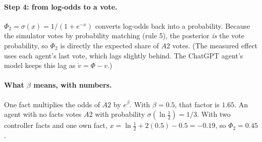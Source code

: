 \documentclass[10pt,a4paper]{article}
\begin{document}
\paragraph{Step 4: from log-odds to a vote.} $\Phi_2=\sigma(x)=1/(1+e^{-x})$ converts log-odds back into a probability.
Because the simulator votes by probability matching (rule 5), the posterior \emph{is} the vote probability, so
$\Phi_2$ is directly the expected share of $A2$ votes. (The measured effect uses each agent's last vote, which lags
slightly behind. The ChatGPT agent's model keeps this lag as $\dot v=\Phi-v$.)

\paragraph{What $\beta$ means, with numbers.} One fact multiplies the odds of $A2$ by $e^{\beta}$. With $\beta=0.5$,
that factor is $1.65$. An agent with no facts votes $A2$ with probability $\sigma(\ln\frac12)=1/3$. With two controller
facts and one own fact, $x=\ln\frac12+2(0.5)-0.5=-0.19$, so $\Phi_2=0.45$.
\end{document}
